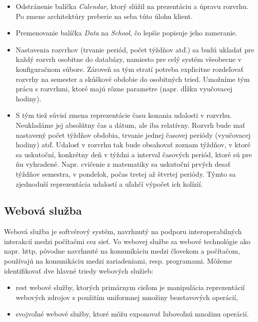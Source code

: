 \begin{itemize}
\item Odstránenie balíčka \emph{Calendar}, ktorý slúžil na prezentáciu a úpravu
  rozvrhu. Po zmene architektúry preberie na seba túto úlohu klient.
\item Premenovanie balíčka \emph{Data} na \emph{School}, čo lepšie popisuje jeho
  zameranie.
\item Nastavenia rozvrhov (trvanie periód, počet týždňov atď.) sa budú ukladať
  pre každý rozvrh osobitne do databázy, namiesto pre celý systém všeobecne v
  konfiguračnom súbore. Zároveň sa tým stratí potreba explicitne rozdeľovať
  rozvrhy na semester a skúškové obdobie do osobitných tried. Umožníme tým prácu
  s rozvrhmi, ktoré majú rôzne parametre (napr. dĺžku vyučovacej hodiny). 
\item S tým tiež súvisí zmena reprezentácie času konania udalosti v rozvrhu.
  Neukladáme jej absolútny čas a dátum, ale iba relatívny. Rozvrh bude mať
  nastavený počet týždňov obdobia, trvanie jednej časovej periódy (vyučovacej
  hodiny) atď. Udalosť v rozvrhu tak bude obsahovať zoznam týždňov, v ktoré sa
  uskutoční, konkrétny deň v týždni a interval časových periód, ktoré sú pre ňu
  vyhradené. Napr. cvičenie z matematiky sa uskutoční prvých desať týždňov
  semestra, v pondelok, počas tretej až štvrtej periódy. Týmto sa zjednoduší
  reprezentácia udalostí a uľahčí výpočet ich kolízií.
\end{itemize}

\subsection{Webová služba}
\label{subsec:server_design}

Webová služba je softvérový systém, navrhnutý na podporu interoperabilných
interakcií medzi počítačmi cez sieť. \cite{w3c_ws_gloss} Vo webovej službe sa
webové technológie ako napr. \acrshort{http}, pôvodne navrhnuté na komunikáciu
medzi človekom a počítačom, používajú na komunikáciu medzi zariadeniami, resp.
programami. Môžeme identifikovať dve hlavné triedy webových služieb:

\begin{itemize}
\item \acrshort{rest} webové služby, ktorých primárnym cieľom je manipulácia
  reprezentácií webových zdrojov s použitím uniformnej množiny bezstavových
  operácií,
\item svojvoľné webové služby, ktoré môžu exponovať ľubovoľnú množinu operácií.
  \cite{w3c_ws_arch}
\end{itemize}


